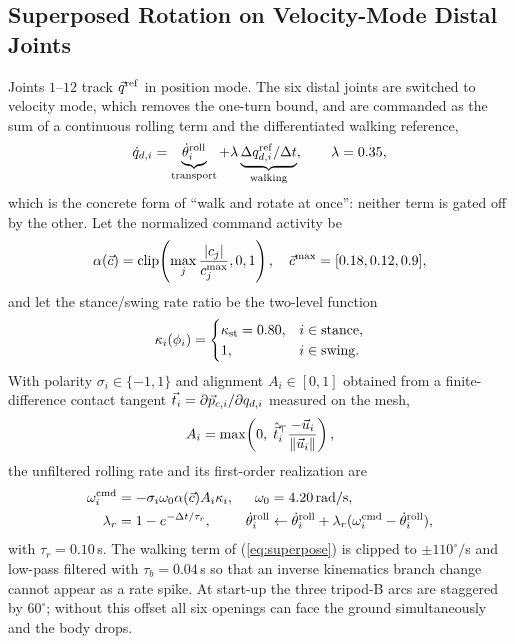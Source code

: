 \subsection{Superposed Rotation on Velocity-Mode Distal Joints}\label{sub:superpose}

Joints $1$--$12$ track $\vec{q}^{\rm ref}$ in position mode. The six distal
joints are switched to velocity mode, which removes the one-turn bound, and are
commanded as the sum of a continuous rolling term and the differentiated
walking reference,
\begin{equation}
 \dot q_{d,i}=\underbrace{\dot\theta_i^{\rm roll}}_{\text{transport}}
 +\lambda\underbrace{\Delta q^{\rm ref}_{d,i}/\Delta t}_{\text{walking}},
 \qquad \lambda=0.35,                                          \label{eq:superpose}
\end{equation}
which is the concrete form of ``walk and rotate at once'': neither term is gated
off by the other. Let the normalized command activity be
\begin{equation}
 \alpha(\vec{c})=\operatorname{clip}\!\left(\max_j
 \frac{|c_j|}{c_j^{\max}},0,1\right),\quad
 \vec{c}^{\max}=[0.18,0.12,0.9],                              \label{eq:activity}
\end{equation}
and let the stance/swing rate ratio be the two-level function
\begin{equation}
 \kappa_i(\phi_i)=\begin{cases}
 \kappa_{\rm st}=0.80,& i\in\text{stance},\\
 1,& i\in\text{swing}.\end{cases}                              \label{eq:kappa}
\end{equation}
With polarity $\sigma_i\in\{-1,1\}$ and alignment $A_i\in[0,1]$ obtained from a
finite-difference contact tangent $\vec{t}_i=\partial\vec{p}_{c,i}/\partial
q_{d,i}$ measured on the mesh,
\begin{equation}
 A_i=\max\!\left(0,\;\hat{\vec{t}}_i^\top
 \frac{-\vec{u}_i}{\|\vec{u}_i\|}\right),                    \label{eq:align}
\end{equation}
the unfiltered rolling rate and its first-order realization are
\begin{align}
 \omega_i^{\rm cmd}&=-\sigma_i\omega_0\alpha(\vec{c})A_i\kappa_i,
 &\omega_0&=4.20\,\mathrm{rad/s},                              \label{eq:rollcmd}\\
 \lambda_r&=1-e^{-\Delta t/\tau_r},&
 \dot\theta_i^{\rm roll}&\leftarrow\dot\theta_i^{\rm roll}
 +\lambda_r(\omega_i^{\rm cmd}-\dot\theta_i^{\rm roll}),       \label{eq:rolllpf}
\end{align}
with $\tau_r=0.10\,$s. The walking term of (\ref{eq:superpose}) is clipped to
$\pm110^\circ/$s and low-pass filtered with $\tau_b=0.04\,$s so that an inverse
kinematics branch change cannot appear as a rate spike. At start-up the three
tripod-B arcs are staggered by $60^\circ$; without this offset all six openings
can face the ground simultaneously and the body drops.

